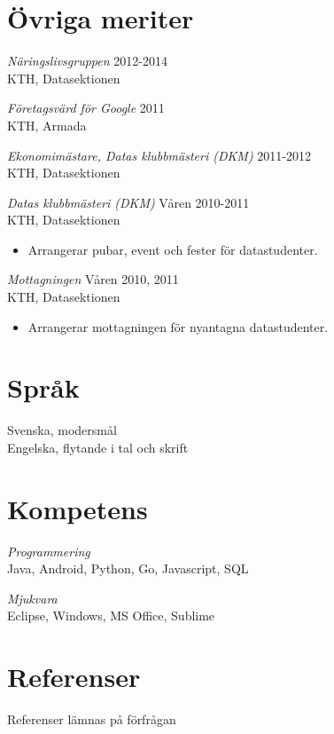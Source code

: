 \documentclass[margin, 10pt]{res} %
\begin{document}
\begin{resume}
\section{Övriga meriter}

{\sl Näringslivsgruppen} \hfill 2012-2014 \\
KTH, Datasektionen


{\sl Företagsvärd för Google} \hfill 2011 \\
KTH, Armada

{\sl Ekonomimästare, Datas klubbmästeri (DKM)} \hfill 2011-2012 \\
KTH, Datasektionen

{\sl Datas klubbmästeri (DKM)} \hfill Våren 2010-2011 \\
KTH, Datasektionen
\begin{itemize} 
\item Arrangerar pubar, event och fester för datastudenter.
\end{itemize} 

{\sl Mottagningen} \hfill Våren 2010, 2011 \\
KTH, Datasektionen
\begin{itemize} 
\item Arrangerar mottagningen för nyantagna datastudenter.
\end{itemize} 


\section{Språk}
Svenska, modersmål \\
Engelska, flytande i tal och skrift


\section{Kompetens}
{\sl Programmering} \\
Java, Android, Python, Go, Javascript, SQL

{\sl Mjukvara} \\
Eclipse, Windows, MS Office, Sublime


\section{Referenser}
Referenser lämnas på förfrågan


\end{resume}
\end{document}

